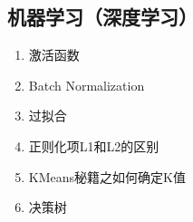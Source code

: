 \documentclass[letterpaper,10pt,english]{sphinxmanual}
\begin{document}
\subsection{机器学习（深度学习）}
\label{\detokenize{else/02_interview:id4}}\begin{enumerate}
\item {} 
激活函数

\end{enumerate}
\begin{quote}

\end{quote}
\begin{enumerate}
\setcounter{enumi}{1}
\item {} 
Batch Normalization

\end{enumerate}
\begin{quote}

\end{quote}
\begin{enumerate}
\setcounter{enumi}{2}
\item {} 
过拟合

\end{enumerate}
\begin{quote}

\end{quote}
\begin{enumerate}
\setcounter{enumi}{3}
\item {} 
正则化项L1和L2的区别

\end{enumerate}
\begin{quote}

\end{quote}
\begin{enumerate}
\setcounter{enumi}{4}
\item {} 
KMeans秘籍之如何确定K值

\end{enumerate}
\begin{quote}

\end{quote}
\begin{enumerate}
\setcounter{enumi}{5}
\item {} 
决策树

\end{enumerate}
\end{document}
